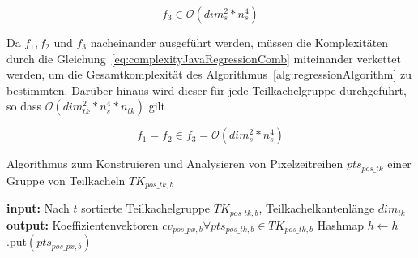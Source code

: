 \begin{equation} \label{eq:complexityJavaRegression3}
f_3 \in \mathcal{O}(dim_{s}^2 * n_{s}^4)
\end{equation}

Da $f_1, f_2$ und $f_3$ nacheinander ausgeführt werden, müssen die Komplexitäten durch die Gleichung~\ref{eq:complexityJavaRegressionComb} miteinander verkettet werden, um die Gesamtkomplexität des Algorithmus~\ref{alg:regressionAlgorithm} zu bestimmten. Darüber hinaus wird dieser für jede Teilkachelgruppe durchgeführt, so dass $\mathcal{O}(dim_{tk}^2 * n_{s}^4 * n_{tk})$ gilt

\begin{equation} \label{eq:complexityJavaRegressionComb}
f_1 = f_2 \in f_3 = \mathcal{O}(dim_{s}^2 * n_{s}^4)
\end{equation}

\begin{algorithm}[H]
\small
\caption{Algorithmus zum Konstruieren und Analysieren von Pixelzeitreihen  $pts_{pos\_tk}$ einer Gruppe von Teilkacheln $TK_{pos\_tk, b}$}
\label{alg:regressionAlgorithm}
\begin{algorithmic}[1]
	\State \textbf{input:} Nach $t$ sortierte Teilkachelgruppe $TK_{pos\_tk, b}$, Teilkachelkantenlänge $dim_{tk}$ 
	\State \textbf{output:} Koeffizientenvektoren $cv_{pos\_px, b} \forall pts_{pos\_tk, b} \in TK_{pos\_tk, b}$
	  \label{alg:constructPTS}
        		  \label{alg:iterY1}
			\State Hashmap $h \leftarrow h$.put$(pts_{pos\_px, b})$  
		\EndFor
	\EndFor
	  \label{alg:iterTK}
		  \label{alg:iterX1}
        			  \label{alg:iterY1}
				  \label{alg:endIterTK}
			\EndFor
		\EndFor
	\EndFor
	  \label{alg:iterPTSJava}
		  \label{alg:defineSVR}
		  \label{alg:normalizeY}
		  \label{alg:constructSVR}
		  \label{alg:executeRegression}
	\EndFor
\EndFunction
\end{algorithmic}
\end{algorithm}

